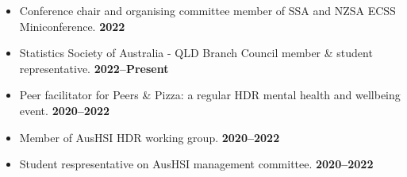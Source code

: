 \begin{itemize}
	\item Conference chair and organising committee member of SSA and NZSA ECSS Miniconference. \hfill\textbf{2022}
	\item Statistics Society of Australia - QLD Branch Council member \& student representative. \hfill\textbf{2022--Present}
	\item Peer facilitator for Peers \& Pizza: a regular HDR mental health and wellbeing event. \hfill\textbf{2020--2022}
	\item Member of AusHSI HDR working group. \hfill\textbf{2020--2022}
	\item Student respresentative on AusHSI management committee. \hfill\textbf{2020--2022}
\end{itemize}\par